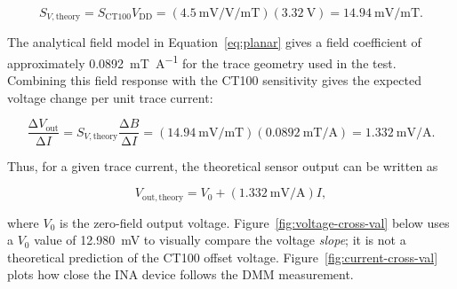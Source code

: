 \documentclass[12pt,a4paper]{article}
\begin{document}
\begin{equation}
S_{V,\mathrm{theory}}
=
S_{\mathrm{CT100}}V_{\mathrm{DD}}
=
\left(\SI{4.5}{\milli\volt\per\volt\per\milli\tesla}\right)
\left(\SI{3.32}{\volt}\right)
=
\SI{14.94}{\milli\volt\per\milli\tesla}.
\label{eq:ct100-voltage-sensitivity}
\end{equation}

The analytical field model in Equation~\eqref{eq:planar} gives a field
coefficient of approximately
\SI{0.0892}{\milli\tesla\per\ampere} for the trace geometry used in the
test. Combining this field response with the CT100 sensitivity gives the
expected voltage change per unit trace current:

\begin{equation}
\frac{\mathrm{   \Delta}V_{\mathrm{out}}}{\mathrm{   \Delta}I}
=
S_{V,\mathrm{theory}}
\frac{\mathrm{   \Delta}B}{\mathrm{   \Delta}I}
=
\left(\SI{14.94}{\milli\volt\per\milli\tesla}\right)
\left(\SI{0.0892}{\milli\tesla\per\ampere}\right)
=
\SI{1.332}{\milli\volt\per\ampere}.
\label{eq:ct100-voltage-current-slope}
\end{equation}

Thus, for a given trace current, the theoretical sensor output can be
written as

\begin{equation}
V_{\mathrm{out,theory}}
=
V_0
+
\left(\SI{1.332}{\milli\volt\per\ampere}\right)I,
\label{eq:ct100-expected-voltage}
\end{equation}

where $V_0$ is the zero-field output voltage. Figure~\ref{fig:voltage-cross-val} below 
uses a $V_0$ value of \SI{12.980}{\milli\volt} to visually compare the voltage
\emph{slope}; it is not a theoretical prediction of the CT100 offset voltage. Figure~\ref{fig:current-cross-val} plots how close the INA device follows the DMM measurement.
\end{document}
